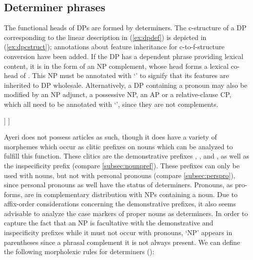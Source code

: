\subsection{Determiner phrases}
\label{subsec:dps}

The functional heads of DPs are formed by determiners. The c-structure of a DP 
corresponding to the linear description in (\ref{ex:dpdef}) is depicted in 
(\ref{ex:dpcstruct}); annotations about feature inheritance for 
c-to-f-structure conversion have been added. If the DP has a dependent phrase 
providing lexical content, it is in the form of an NP complement, whose head 
forms a lexical co-head of . This NP must be annotated with `\updown{}' 
to signify that its features are inherited to DP wholesale. Alternatively, a DP 
containing a pronoun may also be modified by an NP adjunct, a possessive NP, an 
AP or a relative-clause CP, which all need to be annotated with `\pass{\Adj}', 
since they are not complements.

\ex\label{ex:dpcstruct}
\begin{forest}
[{\anno[\pass{df} \logor{} \pass{gf}]{DP}}
	[\anno{\xbar{D}}
		[\anno{\xhead{D}}]
		[{$\left(\anno[{%
		\updown{}\\%
		\logor{} \pass{\Adj}%
	}]{XP}\right)$}]
	]
]
\end{forest}
\xe

Ayeri does not possess articles as such, though it does have a variety of 
morphemes which occur as clitic prefixes on nouns which can be analyzed to 
fulfill this function. These clitics are the demonstrative prefixes 
, , and , 
as well as the inspecificity prefix  (compare 
\autoref{subsec:nounpref}). These prefixes can only be used with nouns, but not 
with personal pronouns (compare \autoref{subsec:perspro}), since personal 
pronouns as well have the status of determiners. Pronouns, as pro-forms, are in 
complementary distribution with NPs containing a noun. Due to affix-order 
considerations concerning the demonstrative prefixes, it also seems advisable 
to analyze the case markers of proper nouns as determiners. In order to capture 
the fact that an NP is facultative with the demonstrative and inspecificity 
prefixes while it must not occur with pronouns, `NP' appears in parentheses 
since a phrasal complement it is not always present. We can define the 
following morpholexic rules for determiners ():

